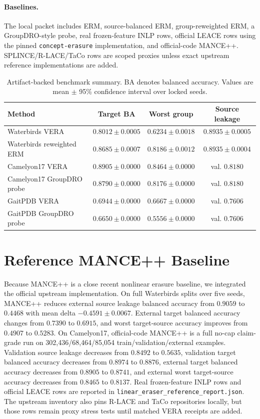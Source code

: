 \documentclass[10pt,twocolumn]{article}
\begin{document}
\paragraph{Baselines.}
The local packet includes ERM, source-balanced ERM, group-reweighted ERM, a
GroupDRO-style probe, real frozen-feature INLP rows, official LEACE rows using
the pinned \texttt{concept-erasure} implementation, and official-code MANCE++.
SPLINCE/R-LACE/TaCo rows are scoped proxies unless exact upstream reference
implementations are added.

\begin{table}[t]
\centering
\caption{Artifact-backed benchmark summary. BA denotes balanced accuracy.
Values are mean $\pm$ 95\% confidence interval over locked seeds.}
\label{tab:main}
\begin{tabular}{@{}lccc@{}}
\toprule
Method & Target BA & Worst group & Source leakage \\
\midrule
Waterbirds VERA & $0.8012 \pm 0.0005$ & $0.6234 \pm 0.0018$ & $0.8935 \pm 0.0005$ \\
Waterbirds reweighted ERM & $0.8685 \pm 0.0007$ & $0.8186 \pm 0.0012$ & $0.8935 \pm 0.0004$ \\
Camelyon17 VERA & $0.8905 \pm 0.0000$ & $0.8464 \pm 0.0000$ & val. $0.8180$ \\
Camelyon17 GroupDRO probe & $0.8790 \pm 0.0000$ & $0.8176 \pm 0.0000$ & val. $0.8180$ \\
GaitPDB VERA & $0.6944 \pm 0.0000$ & $0.6667 \pm 0.0000$ & val. $0.7606$ \\
GaitPDB GroupDRO probe & $0.6650 \pm 0.0000$ & $0.5556 \pm 0.0000$ & val. $0.7606$ \\
\bottomrule
\end{tabular}
\end{table}

\section{Reference MANCE++ Baseline}

Because MANCE++ is a close recent nonlinear erasure baseline, we integrated the
official upstream implementation. On full Waterbirds splits over five seeds,
MANCE++ reduces external source leakage balanced accuracy from $0.9059$ to
$0.4468$ with mean delta $-0.4591 \pm 0.0067$. External target balanced
accuracy changes from $0.7390$ to $0.6915$, and worst target-source accuracy
improves from $0.4907$ to $0.5283$. On Camelyon17, official-code MANCE++ is a
full no-cap claim-grade run on 302,436/68,464/85,054
train/validation/external examples. Validation source leakage decreases from
$0.8492$ to $0.5635$, validation target balanced accuracy decreases from
$0.8974$ to $0.8876$, external target balanced accuracy decreases from
$0.8905$ to $0.8741$, and external worst target-source accuracy decreases from
$0.8465$ to $0.8137$. Real frozen-feature INLP rows and official LEACE rows
are reported in \texttt{linear\_eraser\_reference\_report.json}. The upstream
inventory also pins R-LACE and TaCo repositories locally, but those rows remain
proxy stress tests until matched VERA receipts are added.
\end{document}
